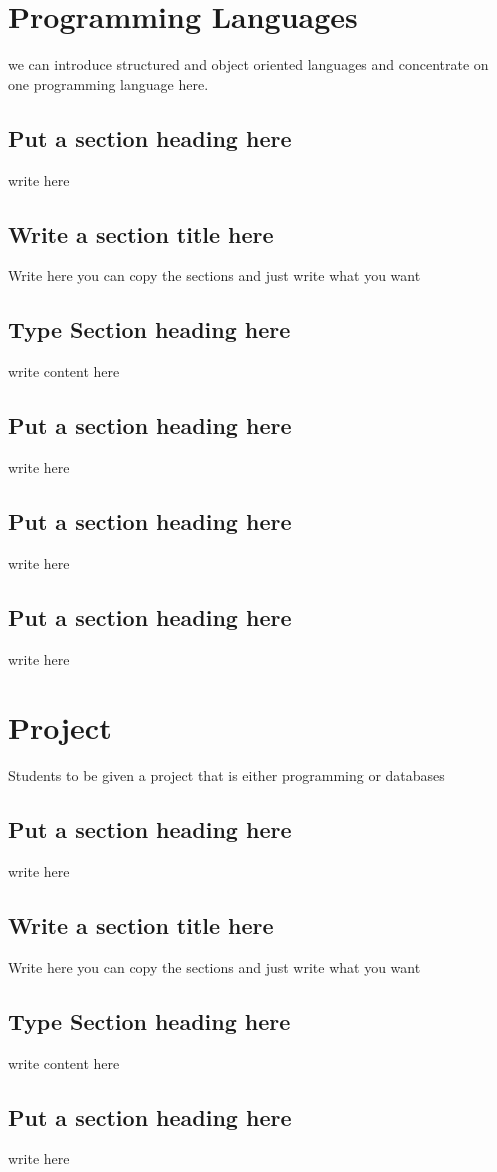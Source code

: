 \documentclass[a4paper,twoside]{scrbook}
\begin{document}
\chapter{Programming Languages}\label{ch6}
we can introduce structured and object oriented languages and concentrate on one programming language here.
\section{Put a section heading here}
write here
\section{Write a section title here}
Write here you can copy the sections and just write what you want
\section{Type Section heading here}
write content here
\section{Put a section heading here}
write here
\section{Put a section heading here}
write here
\section{Put a section heading here}
write here
\chapter{Project}\label{ch7}
Students to be given a project that is either programming or databases
\section{Put a section heading here}
write here
\section{Write a section title here}
Write here you can copy the sections and just write what you want
\section{Type Section heading here}
write content here
\section{Put a section heading here}
write here
\end{document}
